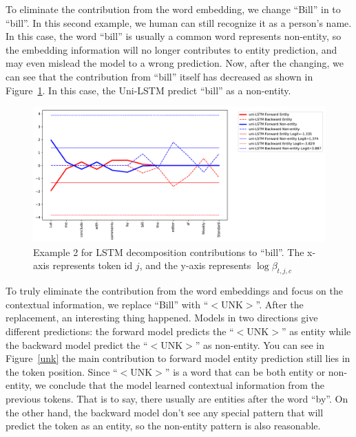\documentclass{article}
\begin{document}
To eliminate the contribution from the word embedding, we change ``Bill'' in to ``bill''. In this second example, we human can still recognize it as a person's name. In this case, the word ``bill'' is usually a common word represents non-entity, so the embedding information will no longer contributes to entity prediction, and may even mislead the model to a wrong prediction. Now, after the changing, we can see that the contribution from ``bill'' itself has decreased as shown in Figure~\ref{fig:bill}. In this case, the Uni-LSTM predict ``bill'' as a non-entity. 

\begin{figure}[t]
	\centering
	\includegraphics[width=\linewidth]{uni-bill2.pdf}
	\caption{Example 2 for LSTM decomposition contributions to ``bill''. The x-axis represents token id $j$, and the y-axis represents $\log \beta_{t, j, c}$}
	\label{fig:bill}
\end{figure}

To truly eliminate the contribution from the word embeddings and focus on the contextual information, we replace ``Bill'' with ``$<$UNK$>$''. After the replacement, an interesting thing happened. Models in two directions give different predictions: the forward model predicts the ``$<$UNK$>$'' as entity while the backward model predict the ``$<$UNK$>$'' as non-entity. You can see in Figure~\ref{unk} the main contribution to forward model entity prediction still lies in the token position. Since ``$<$UNK$>$'' is a word that can be both entity or non-entity, we conclude that the model learned contextual information from the previous tokens. That is to say, there usually are entities after the word 
``by''. On the other hand, the backward model don't see any special pattern that will predict the token as an entity, so the non-entity pattern is also reasonable. 
\end{document}
